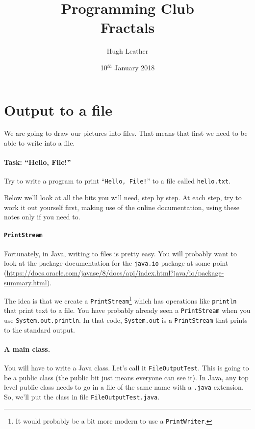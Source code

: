 \documentclass{article}
\title{
    \textbf{Programming Club}\\
    Fractals
}
\author{Hugh Leather}
\date{10$^{th}$ January 2018}
\begin{document}
    \maketitle

    \section{Output to a file} 
    
        We are going to draw our pictures into files. That means that first we need to be able to write into a file. 
        \paragraph{Task: ``Hello, File!''}
            Try to write a program to print ``\texttt{Hello, File!}'' to a file called \texttt{hello.txt}.

            Below we'll look at all the bits you will need, step by step. At each step, try to work it out yourself first, making use of
            the online documentation, using these notes only if you need to.
        
        \paragraph{\texttt{PrintStream}}
            
            Fortunately, in Java, writing to files is pretty easy. You will probably want to look at the package documentation for the
            \texttt{java.io} package at some point
            (\url{https://docs.oracle.com/javase/8/docs/api/index.html?java/io/package-summary.html}).
     
            The idea is that we create a \texttt{PrintStream}\footnote{It would probably be a bit more modern to use a
            \texttt{PrintWriter}.} which has operations like \texttt{println} that print text to a file. You have probably already seen a
            \texttt{PrintStream} when you use \texttt{System.out.println}. In that code, \texttt{System.out} is a \texttt{PrintStream} that
            prints to the standard output.
        
        \paragraph{A main class.} 
        
            You will have to write a Java class. Let's call it \texttt{FileOutputTest}. This is going to be a public class (the public bit
            just means everyone can see it). In Java, any top level public class needs to go in a file of the same name with a
            \texttt{.java} extension. So, we'll put the class in file \texttt{FileOutputTest.java}.
            
\end{document}
